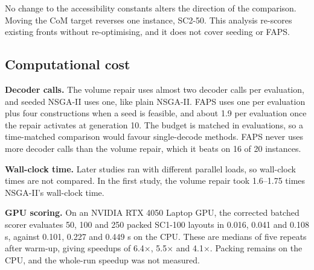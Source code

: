 \documentclass[journal]{IEEEtran}
\begin{document}
\begin{table}[!t]
\caption{Robustness of the repair-against-NSGA-II comparison (eight instances).}\label{tab:8}
\centering\footnotesize
{}
\end{table}

No change to the accessibility constants alters the direction of the comparison. Moving the CoM target reverses one instance, SC2-50. This analysis re-scores existing fronts without re-optimising, and it does not cover seeding or FAPS.

\subsection{Computational cost}\label{sec:6.9}

\textbf{Decoder calls.} The volume repair uses almost two decoder calls per evaluation, and seeded NSGA-II uses one, like plain NSGA-II. FAPS uses one per evaluation plus four constructions when a seed is feasible, and about 1.9 per evaluation once the repair activates at generation 10. The budget is matched in evaluations, so a time-matched comparison would favour single-decode methods. FAPS never uses more decoder calls than the volume repair, which it beats on 16 of 20 instances.

\textbf{Wall-clock time.} Later studies ran with different parallel loads, so wall-clock times are not compared. In the first study, the volume repair took 1.6--1.75 times NSGA-II's wall-clock time.

\textbf{GPU scoring.} On an NVIDIA RTX 4050 Laptop GPU, the corrected batched scorer evaluates 50, 100 and 250 packed SC1-100 layouts in 0.016, 0.041 and 0.108 s, against 0.101, 0.227 and 0.449 s on the CPU. These are medians of five repeats after warm-up, giving speedups of 6.4\(\times\), 5.5\(\times\) and 4.1\(\times\). Packing remains on the CPU, and the whole-run speedup was not measured.
\end{document}
